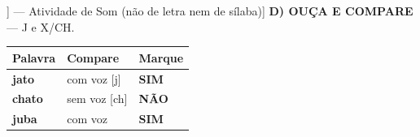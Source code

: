 \begin{exercicio}[Som /j/ [[Z]] --- Atividade de Som (não de letra nem de sílaba)]
\textbf{D) OUÇA E COMPARE} --- J e X/CH.

\begin{center}
\begin{tabular}{@{}p{4.2cm}p{6.2cm}p{1.6cm}@{}}
\hline
\textbf{Palavra} & \textbf{Compare} & \textbf{Marque} \\
\hline
\textbf{jato} & com voz [j] & \textbf{SIM} \\
\textbf{chato} & sem voz [ch] & \textbf{NÃO} \\
\textbf{juba} & com voz & \textbf{SIM} \\
\hline
\end{tabular}
\end{center}

\end{exercicio}

